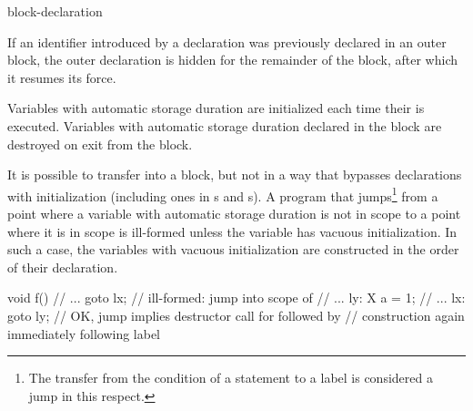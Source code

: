\begin{bnf}
\br
    block-declaration
\end{bnf}

If an identifier introduced by a declaration was previously declared in
an outer block,
%
%
%
the outer declaration is hidden for the remainder of the block, after
which it resumes its force.

\pnum
{}%
%
Variables with automatic storage duration are
initialized each time their  is executed.
%
Variables with automatic storage duration declared in the block are
destroyed on exit from the block.

\pnum
{}%
%
It is possible to transfer into a block, but not in a way that bypasses
declarations with initialization (including ones in s
and s).
A program that jumps\footnote{The transfer from the condition of a  statement to a
 label is considered a jump in this respect.}
from a point where a variable with automatic storage duration is
not in scope to a point where it is in scope is ill-formed unless
the variable has vacuous initialization.
In such a case, the variables with vacuous initialization
are constructed in the order of their declaration.
\begin{example}

\begin{codeblock}
void f() {
  // ...
  goto lx;          // ill-formed: jump into scope of 
  // ...
ly:
  X a = 1;
  // ...
lx:
  goto ly;          // OK, jump implies destructor call for  followed by
                    // construction again immediately following label 
}
\end{codeblock}
\end{example}


